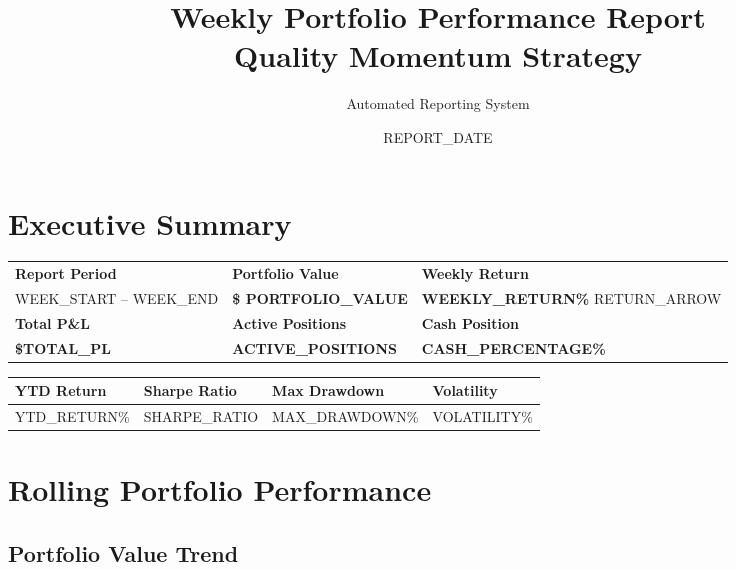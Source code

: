 \documentclass[11pt]{article}
\title{\textbf{Weekly Portfolio Performance Report} \\ 
        \large \textcolor{primary}{Quality Momentum Strategy}}
\author{Automated Reporting System}
\date{{{REPORT_DATE}}}
\renewcommand{\arraystretch}{1.3}
\begin{document}
\maketitle

\section{Executive Summary}

\renewcommand{\arraystretch}{1.3}
\begin{center}
\begin{tabularx}{\textwidth}{|X|X|X|}
\hline
\rowcolor{primary!10}
\multicolumn{3}{|c|}{\textbf{\large Portfolio Performance Summary}} \\
\hline
\textbf{Report Period} & \textbf{Portfolio Value} & \textbf{Weekly Return} \\
\hline
{{WEEK_START}} -- {{WEEK_END}} & \textcolor{primary}{\textbf{\$ {{PORTFOLIO_VALUE}}}} & \textcolor{{{RETURN_COLOR}}}{\textbf{{{WEEKLY_RETURN}}\%}} {{RETURN_ARROW}} \\
\hline
\textbf{Total P\&L} & \textbf{Active Positions} & \textbf{Cash Position} \\
\hline
\textcolor{{{PL_COLOR}}}{\textbf{\${{TOTAL_PL}}}} & \textbf{{{ACTIVE_POSITIONS}}} & \textbf{{{CASH_PERCENTAGE}}\%} \\
\hline
\end{tabularx}
\end{center}

\vspace{0.5cm}

\begin{center}
\begin{tabularx}{\textwidth}{|X|X|X|X|}
\hline
\rowcolor{secondary!10}
\textbf{YTD Return} & \textbf{Sharpe Ratio} & \textbf{Max Drawdown} & \textbf{Volatility} \\
\hline
{{YTD_RETURN}}\% & {{SHARPE_RATIO}} & {{MAX_DRAWDOWN}}\% & {{VOLATILITY}}\% \\
\hline
\end{tabularx}
\end{center}

\section{Rolling Portfolio Performance}

\subsection{Portfolio Value Trend}
\end{document}

